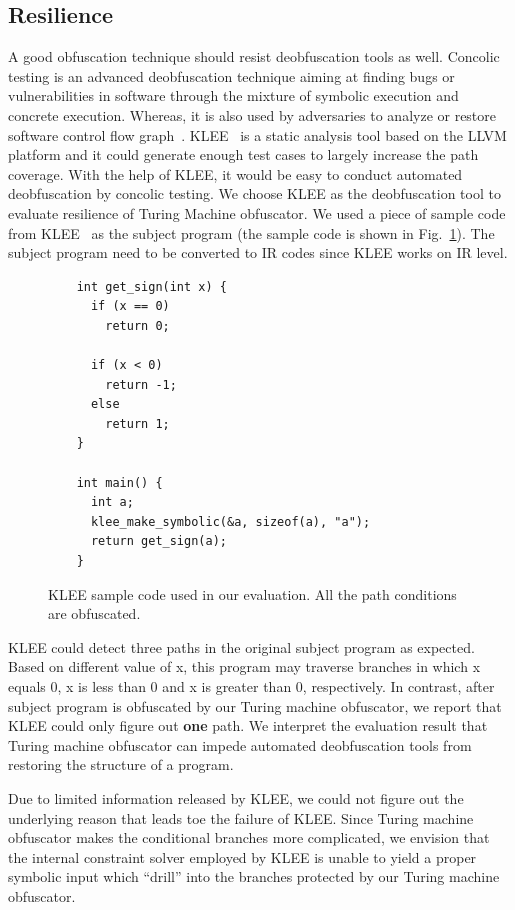 \documentclass[lnicst]{svmultln}
\newcommand{\F}{Fig.}
\begin{document}
\subsection{Resilience}
\label{subsec:resilience}
A good obfuscation technique should resist deobfuscation tools as well. Concolic
testing is an advanced deobfuscation technique aiming at finding bugs or
vulnerabilities in software through the mixture of symbolic execution and
concrete execution. Whereas, it is also used by adversaries to analyze or
restore software control flow graph~\cite{Cadar,Sen,Cute}. KLEE~\cite{klee} is a
static analysis tool based on the LLVM platform and it could generate enough
test cases to largely increase the path coverage. With the help of KLEE, it
would be easy to conduct automated deobfuscation by concolic testing. We choose
KLEE as the deobfuscation tool to evaluate resilience of Turing Machine
obfuscator. We used a piece of sample code from KLEE~\cite{kleesample} as the
subject program (the sample code is shown in \F~\ref{fig:klee-sample}). The
subject program need to be converted to IR codes since KLEE works on IR level.

\begin{figure}[h]
\centering
\begin{lstlisting}
    int get_sign(int x) {
      if (x == 0)
        return 0; 

      if (x < 0)
        return -1;
      else 
        return 1;
    }

    int main() {
      int a;
      klee_make_symbolic(&a, sizeof(a), "a");
      return get_sign(a);
    }
\end{lstlisting}
\caption{KLEE sample code used in our evaluation. All the path conditions are obfuscated.}
\label{fig:klee-sample}
\end{figure}


KLEE could detect three paths in the original subject program as expected. Based
on different value of x, this program may traverse branches in which x equals 0,
x is less than 0 and x is greater than 0, respectively. In contrast, after
subject program is obfuscated by our Turing machine obfuscator, we report that
KLEE could only figure out \textbf{one} path. We interpret the evaluation result
that Turing machine obfuscator can impede automated deobfuscation tools from
restoring the structure of a program.

Due to limited information released by KLEE, we could not figure out the
underlying reason that leads toe the failure of KLEE. Since Turing machine
obfuscator makes the conditional branches more complicated, we envision that the
internal constraint solver employed by KLEE is unable to yield a proper symbolic
input which ``drill'' into the branches protected by our Turing machine
obfuscator.
\end{document}
